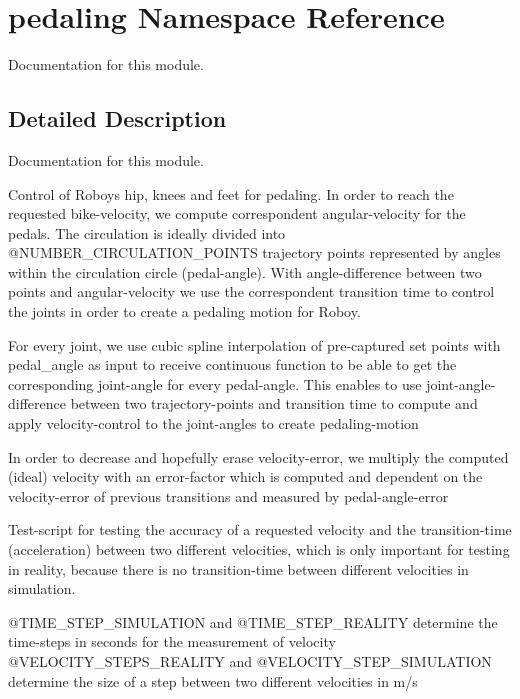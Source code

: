 \hypertarget{namespacepedaling}{}\section{pedaling Namespace Reference}
\label{namespacepedaling}


Documentation for this module.  




\subsection{Detailed Description}
Documentation for this module. 

Control of Roboys\textquotesingle{} hip, knees and feet for pedaling. In order to reach the requested bike-\/velocity, we compute correspondent angular-\/velocity for the pedals. The circulation is ideally divided into @\+N\+U\+M\+B\+E\+R\+\_\+\+C\+I\+R\+C\+U\+L\+A\+T\+I\+O\+N\+\_\+\+P\+O\+I\+N\+TS trajectory points represented by angles within the circulation circle (pedal-\/angle). With angle-\/difference between two points and angular-\/velocity we use the correspondent transition time to control the joints in order to create a pedaling motion for Roboy.

For every joint, we use cubic spline interpolation of pre-\/captured set points with pedal\+\_\+angle as input to receive continuous function to be able to get the corresponding joint-\/angle for every pedal-\/angle. This enables to use joint-\/angle-\/difference between two trajectory-\/points and transition time to compute and apply velocity-\/control to the joint-\/angles to create pedaling-\/motion

In order to decrease and hopefully erase velocity-\/error, we multiply the computed (ideal) velocity with an error-\/factor which is computed and dependent on the velocity-\/error of previous transitions and measured by pedal-\/angle-\/error

Test-\/script for testing the accuracy of a requested velocity and the transition-\/time (acceleration) between two different velocities, which is only important for testing in reality, because there is no transition-\/time between different velocities in simulation.

@\+T\+I\+M\+E\+\_\+\+S\+T\+E\+P\+\_\+\+S\+I\+M\+U\+L\+A\+T\+I\+ON and @\+T\+I\+M\+E\+\_\+\+S\+T\+E\+P\+\_\+\+R\+E\+A\+L\+I\+TY determine the time-\/steps in seconds for the measurement of velocity @\+V\+E\+L\+O\+C\+I\+T\+Y\+\_\+\+S\+T\+E\+P\+S\+\_\+\+R\+E\+A\+L\+I\+TY and @\+V\+E\+L\+O\+C\+I\+T\+Y\+\_\+\+S\+T\+E\+P\+\_\+\+S\+I\+M\+U\+L\+A\+T\+I\+ON determine the size of a step between two different velocities in m/s 